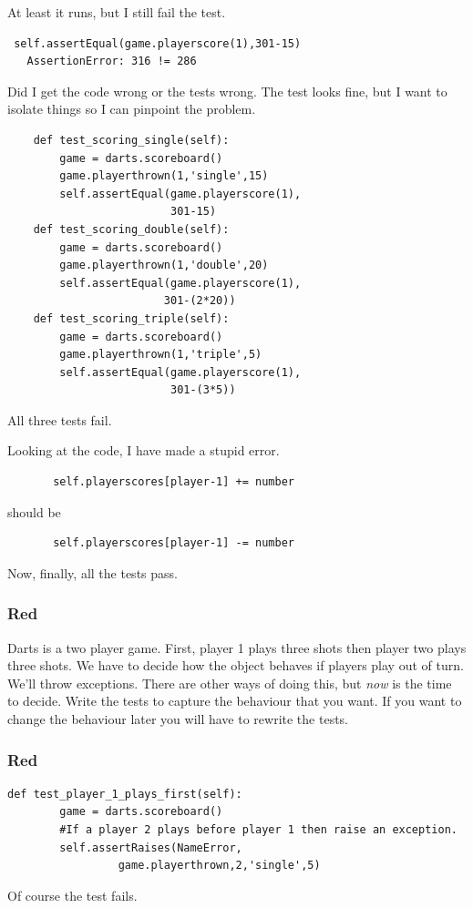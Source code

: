 \documentclass{beamer}
\begin{document}
\begin{frame}[fragile]
At least it runs, but I still fail the test.
\begin{verbatim}
 self.assertEqual(game.playerscore(1),301-15)
   AssertionError: 316 != 286
\end{verbatim}
Did I get the code wrong or the tests wrong. The test looks fine, but
I want to isolate things so I can pinpoint the problem. 
\end{frame}
\begin{frame}[fragile]
\begin{lstlisting}
    def test_scoring_single(self):
        game = darts.scoreboard()
        game.playerthrown(1,'single',15)
        self.assertEqual(game.playerscore(1),
                         301-15)
    def test_scoring_double(self):
        game = darts.scoreboard()
        game.playerthrown(1,'double',20)
        self.assertEqual(game.playerscore(1),
                        301-(2*20))
    def test_scoring_triple(self):
        game = darts.scoreboard()
        game.playerthrown(1,'triple',5)
        self.assertEqual(game.playerscore(1),
                         301-(3*5))
\end{lstlisting}
 All three tests fail.
\end{frame}
\begin{frame}[fragile]
  Looking at the code, I have made a stupid error.
\begin{lstlisting}
       self.playerscores[player-1] += number
\end{lstlisting}
should be
\begin{lstlisting}
       self.playerscores[player-1] -= number
\end{lstlisting}
Now, finally, all the tests pass.
\end{frame}
\begin{frame}[fragile]
\frametitle{Red}
Darts is a two player game. First, player 1 plays three shots then player
two plays three shots. We have to decide how the object behaves if
players play out of turn. We'll throw exceptions. There are other ways
of doing this, but {\em now} is the time to decide. Write the tests to
capture the behaviour that you want. If you want to change the
behaviour later you will have to rewrite the tests.

\end{frame}
\begin{frame}[fragile]
\frametitle{Red}
\begin{lstlisting}
def test_player_1_plays_first(self):
        game = darts.scoreboard()
        #If a player 2 plays before player 1 then raise an exception.
        self.assertRaises(NameError, 
                 game.playerthrown,2,'single',5)   
\end{lstlisting}
Of course the test fails.
  
\end{frame}
\end{document}
